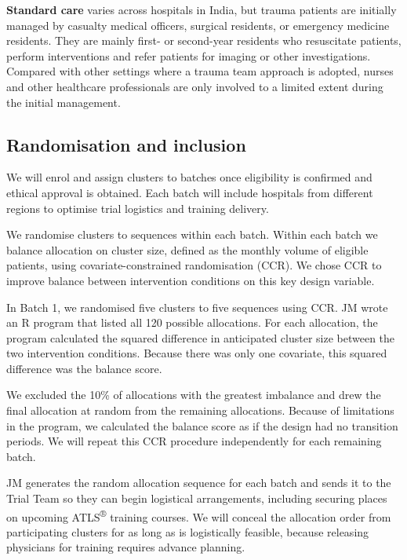 \documentclass[
]{scrartcl}
\begin{document}
\textbf{Standard care} varies across hospitals in India, but trauma
patients are initially managed by casualty medical officers, surgical
residents, or emergency medicine residents. They are mainly first- or
second-year residents who resuscitate patients, perform interventions
and refer patients for imaging or other investigations. Compared with
other settings where a trauma team approach is adopted, nurses and other
healthcare professionals are only involved to a limited extent during
the initial management.

\subsection{Randomisation and
inclusion}\label{sec-randomisation-and-inclusion}

We will enrol and assign clusters to batches once eligibility is
confirmed and ethical approval is obtained. Each batch will include
hospitals from different regions to optimise trial logistics and
training delivery.

We randomise clusters to sequences within each batch. Within each batch
we balance allocation on cluster size, defined as the monthly volume of
eligible patients, using covariate-constrained randomisation (CCR). We
chose CCR to improve balance between intervention conditions on this key
design variable.

In Batch 1, we randomised five clusters to five sequences using CCR. JM
wrote an R program that listed all 120 possible allocations. For each
allocation, the program calculated the squared difference in anticipated
cluster size between the two intervention conditions. Because there was
only one covariate, this squared difference was the balance score.

We excluded the 10\% of allocations with the greatest imbalance and drew
the final allocation at random from the remaining allocations. Because
of limitations in the program, we calculated the balance score as if the
design had no transition periods. We will repeat this CCR procedure
independently for each remaining batch.

JM generates the random allocation sequence for each batch and sends it
to the Trial Team so they can begin logistical arrangements, including
securing places on upcoming ATLS\textsuperscript{®} training courses. We
will conceal the allocation order from participating clusters for as
long as is logistically feasible, because releasing physicians for
training requires advance planning.
\end{document}
